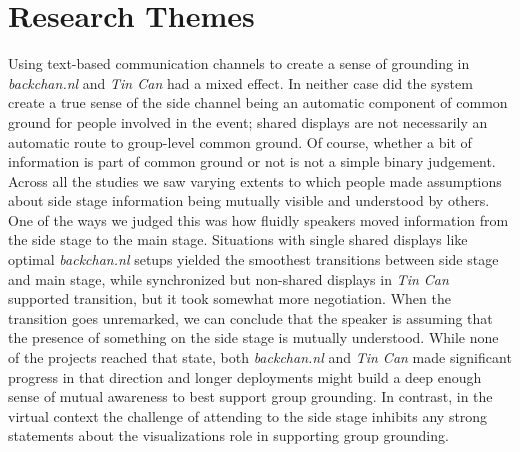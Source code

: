 
\section{Research Themes}

Using text-based communication channels to create a sense of grounding in \emph{backchan.nl} and \emph{Tin Can} had a mixed effect. In neither case did the system create a true sense of the side channel being an automatic component of common ground for people involved in the event; shared displays are not necessarily an automatic route to group-level common ground. Of course, whether a bit of information is part of common ground or not is not a simple binary judgement. Across all the studies we saw varying extents to which people made assumptions about side stage information being mutually visible and understood by others. One of the ways we judged this was how fluidly speakers moved information from the side stage to the main stage.  Situations with single shared displays like optimal \emph{backchan.nl} setups yielded the smoothest transitions between side stage and main stage, while synchronized but non-shared displays in \emph{Tin Can} supported transition, but it took somewhat more negotiation. When the transition goes unremarked, we can conclude that the speaker is assuming that the presence of something on the side stage is mutually understood. While none of the projects reached that state, both \emph{backchan.nl} and \emph{Tin Can} made significant progress in that direction and longer deployments might build a deep enough sense of mutual awareness to best support group grounding. In contrast, in the virtual context the challenge of attending to the side stage inhibits any strong statements about the visualizations role in supporting group grounding.

